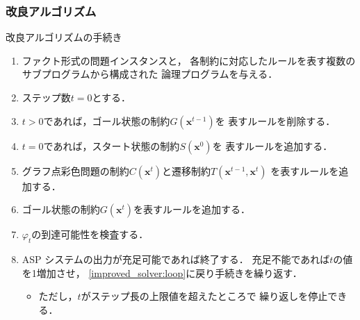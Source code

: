 \begin{frame}
  \frametitle{改良アルゴリズム}

  \begin{block}{改良アルゴリズムの手続き}
    \begin{enumerate}
      \item ファクト形式の問題インスタンスと，
            各制約に対応したルールを表す複数のサブプログラムから構成された
            論理プログラムを与える．
      \item ステップ数$t=0$とする．
      \item $t>0$であれば，ゴール状態の制約$G(\bm{x}^{t -1})$を
            表すルールを削除する． \label{improved_solver:loop}
      \item $t=0$であれば，スタート状態の制約$S(\bm{x}^0)$を
            表すルールを追加する．
      \item グラフ点彩色問題の制約$C(\bm{x}^{t})$と遷移制約$T(\bm{x}^{t-1},\bm{x}^{t})$
            を表すルールを追加する．
      \item ゴール状態の制約$G(\bm{x}^{t})$を表すルールを追加する．
      \item $\varphi_{t}$の到達可能性を検査する．
      \item ASP システムの出力が充足可能であれば終了する．
            充足不能であれば$t$の値を1増加させ，
            \ref{improved_solver:loop}に戻り手続きを繰り返す．
            \begin{itemize}
              \item ただし，$t$がステップ長の上限値を超えたところで
                    繰り返しを停止できる．
            \end{itemize} \label{improved_solver:end}
    \end{enumerate}
  \end{block}
\end{frame}
